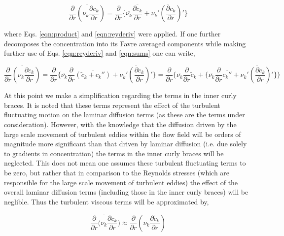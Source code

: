 \begin{displaymath}
	\overline{\frac{\partial}{\partial r}(\nu_k \frac{\partial c_k}{\partial r})} = 
	\frac{\partial}{\partial r}\Big\{\overline{\nu_k} \overline{\frac{\partial c_k}{\partial r}} +
	\overline{\nu_k' (\frac{\partial c_k}{\partial r})'}\Big\}
\end{displaymath}

	where Eqs. \ref{eqn:product} and \ref{eqn:reyderiv} were applied.  If one further decomposes the concentration 
into its Favre averaged components while making further use of Eqs. \ref{eqn:reyderiv} and \ref{eqn:sums} one can write,

\begin{displaymath}
	\overline{\frac{\partial}{\partial r}(\nu_k \frac{\partial c_k}{\partial r})} = \frac{\partial}{\partial r}\Big\{
	\overline{\nu_k}\frac{\partial}{\partial r}
	\overline{(\tilde c_k + c_k'')} + \overline{\nu_k' (\frac{\partial c_k}{\partial r})'}\Big\} = \frac{\partial}
	{\partial r}\Bigg\{
	\overline{\nu_k}\frac{\partial}{\partial r} \tilde c_k + \Big\{\overline{\nu_k}\frac{\partial}{\partial r}\overline{c_k''} 
	+ \overline{\nu_k' (\frac{\partial c_k}{\partial r})'}\Big\}\Bigg\}
\end{displaymath}

	At this point we make a simplification regarding the terms in the inner curly braces.  It is noted that these
terms represent the effect of the turbulent fluctuating motion on the laminar diffusion terms (as 
these are the terms under consideration).  However, with the knowledge that the diffusion driven by the large scale 
movement of turbulent eddies within the flow field will be orders of magnitude more significant than that driven
by laminar diffusion (i.e. due solely to gradients in concentration) the terms in the inner curly braces will be neglected.
This does not mean one assumes these turbulent fluctuating terms to be zero, but rather that in comparison to the Reynolds
stresses (which are responsible for the large scale movement of turbulent eddies) the effect of the overall laminar
diffusion terms (including those in the inner curly braces) will be neglible.  Thus the turbulent viscous terms will be 
approximated by,

\begin{equation}
	\overline{\frac{\partial}{\partial r}(\nu_k \frac{\partial c_k}{\partial r}}) \approx 
	\frac{\partial}{\partial r}(\overline{\nu_k}\frac{\partial \tilde c_k}{\partial r})
\label{eqn:difffluxapprox}
\end{equation}

